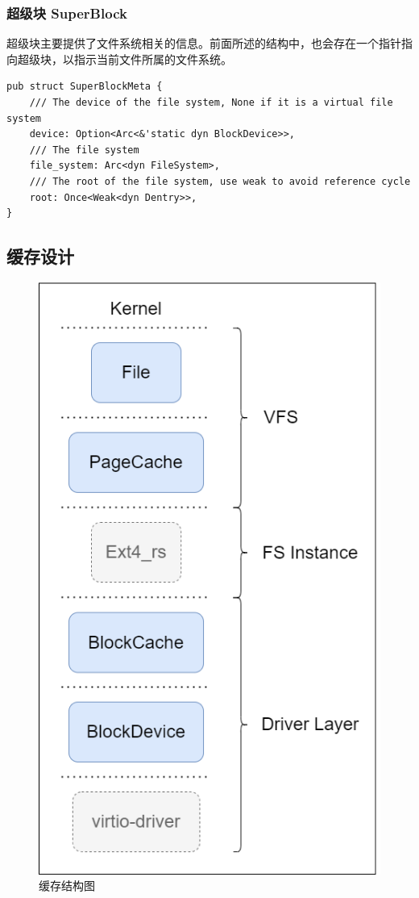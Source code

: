\documentclass{article}
\begin{document}
\subsubsection{超级块 SuperBlock}
超级块主要提供了文件系统相关的信息。前面所述的结构中，也会存在一个指针指向超级块，以指示当前文件所属的文件系统。

\begin{lstlisting}
pub struct SuperBlockMeta {
    /// The device of the file system, None if it is a virtual file system
    device: Option<Arc<&'static dyn BlockDevice>>,
    /// The file system
    file_system: Arc<dyn FileSystem>,
    /// The root of the file system, use weak to avoid reference cycle
    root: Once<Weak<dyn Dentry>>,
}
\end{lstlisting}

\subsection{缓存设计}

\begin{figure}[H]
    \centering
    \includegraphics[width=0.5\linewidth]{assets//fs/structure.drawio.png}
    \caption{缓存结构图}
    \label{fig:enter-label}
\end{figure}
\end{document}
